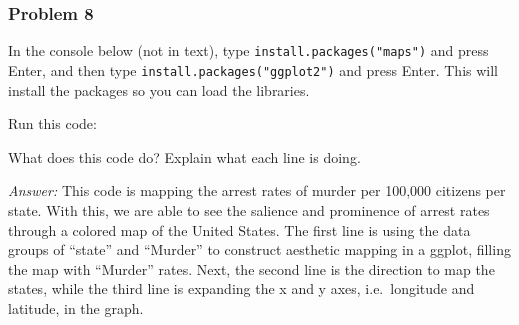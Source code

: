 \documentclass[
]{article}
\newenvironment{Shaded}{\begin{snugshade}}{\end{snugshade}}
\newcommand{\AttributeTok}[1]{\textcolor[rgb]{0.77,0.63,0.00}{#1}}
\newcommand{\FunctionTok}[1]{\textcolor[rgb]{0.00,0.00,0.00}{#1}}
\newcommand{\NormalTok}[1]{#1}
\newcommand{\SpecialCharTok}[1]{\textcolor[rgb]{0.00,0.00,0.00}{#1}}
\newcommand{\StringTok}[1]{\textcolor[rgb]{0.31,0.60,0.02}{#1}}
\begin{document}
\hypertarget{problem-8}{%
\subsubsection{Problem 8}\label{problem-8}}

In the console below (not in text), type
\texttt{install.packages("maps")} and press Enter, and then type
\texttt{install.packages("ggplot2")} and press Enter. This will install
the packages so you can load the libraries.

Run this code:

\begin{Shaded}
\end{Shaded}

What does this code do? Explain what each line is doing.

\emph{Answer:} This code is mapping the arrest rates of murder per
100,000 citizens per state. With this, we are able to see the salience
and prominence of arrest rates through a colored map of the United
States. The first line is using the data groups of ``state'' and
``Murder'' to construct aesthetic mapping in a ggplot, filling the map
with ``Murder'' rates. Next, the second line is the direction to map the
states, while the third line is expanding the x and y axes,
i.e.~longitude and latitude, in the graph.
\end{document}
